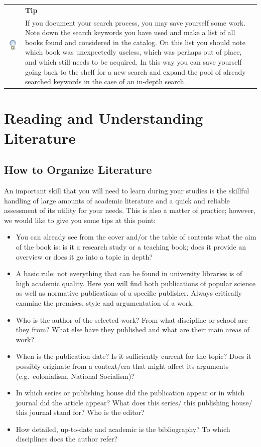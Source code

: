 \documentclass[
  english,
]{scrreprt}
\newlength{\iconwidth}
\newenvironment{displaybox}[2]{%
    \begin{center}
        \setlength\arrayrulewidth{0.75pt}%
        \arrayrulecolor{white}%
        \renewcommand{\arraystretch}{1.3}%
        \begin{tabular}{p{\iconwidth}p{\linewidth-4\tabcolsep-\iconwidth}}
            \multirow{2}{*}{#2}&\cellcolor{boxheadcol}\textbf{\sffamily\color{white}#1} \\%
            \hhline{~-}%
            &\cellcolor{boxcol}%
}{%
            \\
        \end{tabular}
        \arrayrulecolor{black}
    \end{center}
}
\newenvironment{Tip}{%
\begin{displaybox}{Tip}{\includegraphics[width=\iconwidth]{images/icon-tipp}}}%
{\end{displaybox}}
\begin{document}
\begin{Tip}

If you document your search process, you may save yourself some work. Note down the search keywords you have used and make a list of all books found and considered in the catalog. On this list you should note which book was unexpectedly useless, which was perhaps out of place, and which still needs to be acquired. In this way you can save yourself going back to the shelf for a new search and expand the pool of already searched keywords in the case of an in-depth search.

\end{Tip}

\section{Reading and Understanding Literature}\label{sec:reading}

\subsection{How to Organize Literature}\label{how-to-organize-literature}

An important skill that you will need to learn during your studies is the skillful handling of large amounts of academic literature and a quick and reliable assessment of its utility for your needs. This is also a matter of practice; however, we would like to give you some tips at this point:

\begin{itemize}
\item
  You can already see from the cover and/or the table of contents what the aim of the book is: is it a research study or a teaching book; does it provide an overview or does it go into a topic in depth?
\item
  A basic rule: not everything that can be found in university libraries is of high academic quality. Here you will find both publications of popular science as well as normative publications of a specific publisher. Always critically examine the premises, style and argumentation of a work.
\item
  Who is the author of the selected work? From what discipline or school are they from? What else have they published and what are their main areas of work?
\item
  When is the publication date? Is it sufficiently current for the topic? Does it possibly originate from a context/era that might affect its arguments (e.g.~colonialism, National Socialism)?
\item
  In which series or publishing house did the publication appear or in which journal did the article appear? What does this series/ this publishing house/ this journal stand for? Who is the editor?
\item
  How detailed, up-to-date and academic is the bibliography? To which disciplines does the author refer?
\end{itemize}
\end{document}
